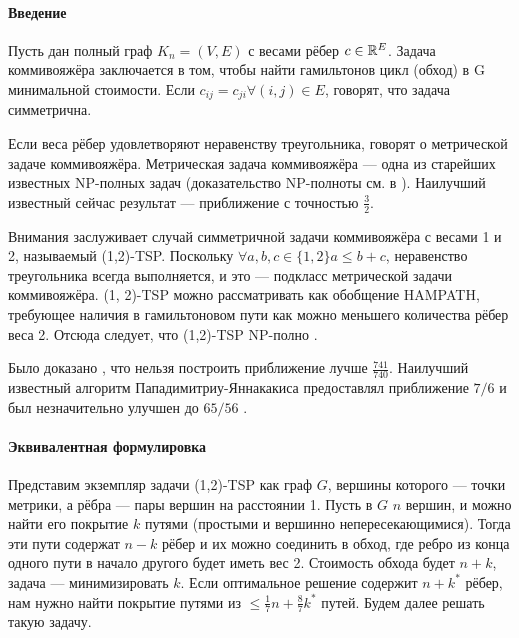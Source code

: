 

\date{}

\renewcommand{\G}{\mathcal{G}}


%

\paragraph{Введение}
Пусть дан полный граф $K_n = (V, E)$ с весами рёбер $c \in \mathbb{R}^E$. Задача коммивояжёра заключается в том, чтобы найти гамильтонов цикл (обход) в G минимальной стоимости. Если $c_{ij} = c_{ji} \forall (i, j)  \in E$, говорят, что задача симметрична. 

Если веса рёбер удовлетворяют неравенству треугольника, говорят о метрической задаче коммивояжёра. Метрическая задача коммивояжёра --- одна из старейших известных NP-полных задач (доказательство NP-полноты см. в \cite{JP85}). Наилучший известный сейчас результат --- приближение с точностью $\frac{3}{2}$\cite{C76}. 

Внимания заслуживает случай симметричной задачи коммивояжёра с весами 1 и 2, называемый (1,2)-TSP. Поскольку $\forall a, b, c \in \{1, 2\} a\le b+c$, неравенство треугольника всегда выполняется, и это --- подкласс метрической задачи коммивояжёра. (1, 2)-TSP можно рассматривать как обобщение HAMPATH, требующее наличия в гамильтоновом пути как можно меньшего количества рёбер веса 2. Отсюда следует, что (1,2)-TSP NP-полно \cite{K72}. 

Было доказано \cite{EK01}, что нельзя построить приближение лучше $\frac{741}{740}$. Наилучший известный алгоритм Пападимитриу-Яннакакиса \cite{PY93} предоставлял приближение $7/6$ и был незначительно улучшен до $65/56$ \cite{BR05}. 

\paragraph{Эквивалентная формулировка}
Представим экземпляр задачи (1,2)-TSP как граф $G$, вершины которого --- точки метрики, а рёбра --- пары вершин на расстоянии 1. Пусть в $G$ $n$ вершин, и можно найти его покрытие $k$ путями (простыми и вершинно непересекающимися). Тогда эти пути содержат $n-k$ рёбер и их можно соединить в обход, где ребро из конца одного пути в начало другого будет иметь вес 2. Стоимость обхода будет $n+k$, задача --- минимизировать $k$. Если оптимальное решение содержит $n+k^*$ рёбер, нам нужно найти покрытие путями из $\le \frac{1}{7}n+\frac{8}{7}k^*$ путей. Будем далее решать такую задачу.

